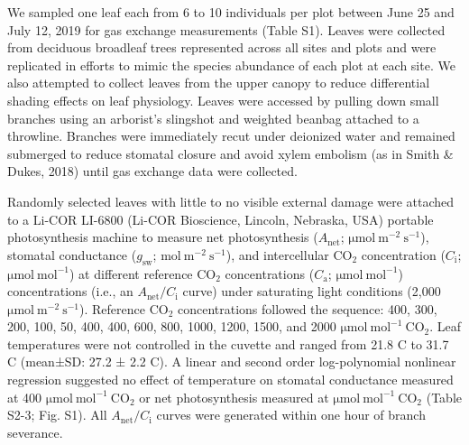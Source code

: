     We sampled one leaf each from 6 to 10 individuals per plot between June 25 and July 12, 2019 for gas exchange measurements (Table S1). Leaves were collected from deciduous broadleaf trees represented across all sites and plots and were replicated in efforts to mimic the species abundance of each plot at each site. We also attempted to collect leaves from the upper canopy to reduce differential shading effects on leaf physiology. Leaves were accessed by pulling down small branches using an arborist’s slingshot and weighted beanbag attached to a throwline. Branches were immediately recut under deionized water and remained submerged to reduce stomatal closure and avoid xylem embolism (as in Smith \& Dukes, 2018) until gas exchange data were collected.

    Randomly selected leaves with little to no visible external damage were attached to a Li-COR LI-6800 (Li-COR Bioscience, Lincoln, Nebraska, USA) portable photosynthesis machine to measure net photosynthesis ($A_\mathrm{{net}}$; $\mathrm{\mu mol\ m^{-2}\ s^{-1}}$), stomatal conductance ($g_\mathrm{{sw}}$; $\mathrm{mol\ m^{-2}\ s^{-1}}$), and intercellular $\mathrm{CO_2}$ concentration ($C_\mathrm{i}$; $\mathrm{\mu mol\ mol^{-1}}$) at different reference $\mathrm{CO_2}$ concentrations ($C_\mathrm{a}$; $\mathrm{\mu mol\ mol^{-1}}$) concentrations (i.e., an $A_\mathrm{{net}}/C_\mathrm{i}$ curve) under saturating light conditions (2,000 $\mathrm{\mu mol\ m^{-2}\ s^{-1}}$). Reference $\mathrm{CO_2}$ concentrations followed the sequence: 400, 300, 200, 100, 50, 400, 400, 600, 800, 1000, 1200, 1500, and 2000 $\mathrm{\mu mol\ mol^{-1}\ CO_2}$. Leaf temperatures were not controlled in the cuvette and ranged from 21.8 \textdegree{}C to 31.7 \textdegree{}C (mean±SD: 27.2 ± 2.2 \textdegree{}C). A linear and second order log-polynomial nonlinear regression suggested no effect of temperature on stomatal conductance measured at 400 $\mathrm{\mu mol\ mol^{-1}\ CO_2}$ or net photosynthesis measured at $\mathrm{\mu mol\ mol^{-1}\ CO_2}$ (Table S2-3; Fig. S1). All $A_\mathrm{{net}}/C_\mathrm{i}$ curves were generated within one hour of branch severance.


